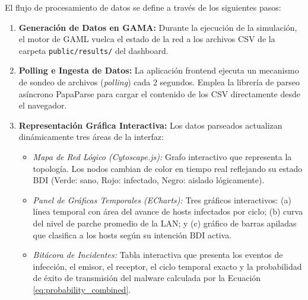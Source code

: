 El flujo de procesamiento de datos se define a través de los siguientes pasos:
\begin{enumerate}
    \item \textbf{Generación de Datos en GAMA:} Durante la ejecución de la simulación, el motor de GAML vuelca el estado de la red a los archivos CSV de la carpeta \texttt{public/results/} del dashboard.
    \item \textbf{Polling e Ingesta de Datos:} La aplicación frontend ejecuta un mecanismo de sondeo de archivos (\textit{polling}) cada 2 segundos. Emplea la librería de parseo asíncrono PapaParse para cargar el contenido de los CSV directamente desde el navegador.
    \item \textbf{Representación Gráfica Interactiva:} Los datos parseados actualizan dinámicamente tres áreas de la interfaz:
    \begin{itemize}
        \item \textit{Mapa de Red Lógico (Cytoscape.js):} Grafo interactivo que representa la topología. Los nodos cambian de color en tiempo real reflejando su estado BDI (Verde: sano, Rojo: infectado, Negro: aislado lógicamente).
        \item \textit{Panel de Gráficas Temporales (ECharts):} Tres gráficos interactivos: (a) línea temporal con área del avance de hosts infectados por ciclo; (b) curva del nivel de parche promedio de la LAN; y (c) gráfico de barras apiladas que clasifica a los hosts según su intención BDI activa.
        \item \textit{Bitácora de Incidentes:} Tabla interactiva que presenta los eventos de infección, el emisor, el receptor, el ciclo temporal exacto y la probabilidad de éxito de transmisión del malware calculada por la Ecuación \ref{eq:probability_combined}.
    \end{itemize}
\end{enumerate}
